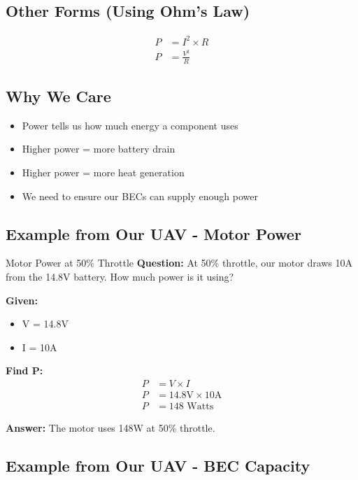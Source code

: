 \documentclass[11pt,letterpaper]{article}
\begin{document}
\subsection{Other Forms (Using Ohm's Law)}

\begin{align*}
P &= I^2 \times R\\
P &= \frac{V^2}{R}
\end{align*}

\subsection{Why We Care}

\begin{itemize}
  \item Power tells us how much energy a component uses
  \item Higher power = more battery drain
  \item Higher power = more heat generation
  \item We need to ensure our BECs can supply enough power
\end{itemize}

\subsection{Example from Our UAV - Motor Power}

\begin{examplebox}{Motor Power at 50\% Throttle}
\textbf{Question:} At 50\% throttle, our motor draws 10A from the 14.8V battery. How much power is it using?

\textbf{Given:}
\begin{itemize}
  \item V = 14.8V
  \item I = 10A
\end{itemize}

\textbf{Find P:}
\begin{align*}
P &= V \times I\\
P &= 14.8\text{V} \times 10\text{A}\\
P &= 148\text{ Watts}
\end{align*}

\textbf{Answer:} The motor uses 148W at 50\% throttle.
\end{examplebox}

\subsection{Example from Our UAV - BEC Capacity}
\end{document}
